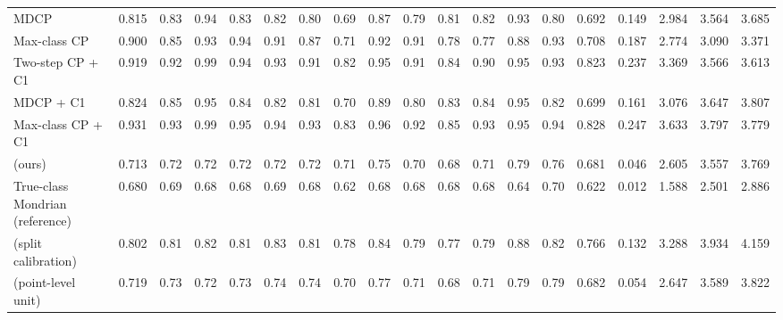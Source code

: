 \begin{table}[!htbp]
{\begin{tabular}{lcccccccccccccccccc}
MDCP & 0.815 & 0.83 & 0.94 & 0.83 & 0.82 & 0.80 & 0.69 & 0.87 & 0.79 & 0.81 & 0.82 & 0.93 & 0.80 & 0.692 & 0.149 & 2.984 & 3.564 & 3.685 \\
Max-class CP & 0.900 & 0.85 & 0.93 & 0.94 & 0.91 & 0.87 & 0.71 & 0.92 & 0.91 & 0.78 & 0.77 & 0.88 & 0.93 & 0.708 & 0.187 & 2.774 & 3.090 & 3.371 \\
Two-step CP + C1 & 0.919 & 0.92 & 0.99 & 0.94 & 0.93 & 0.91 & 0.82 & 0.95 & 0.91 & 0.84 & 0.90 & 0.95 & 0.93 & 0.823 & 0.237 & 3.369 & 3.566 & 3.613 \\
MDCP + C1 & 0.824 & 0.85 & 0.95 & 0.84 & 0.82 & 0.81 & 0.70 & 0.89 & 0.80 & 0.83 & 0.84 & 0.95 & 0.82 & 0.699 & 0.161 & 3.076 & 3.647 & 3.807 \\
Max-class CP + C1 & 0.931 & 0.93 & 0.99 & 0.95 & 0.94 & 0.93 & 0.83 & 0.96 & 0.92 & 0.85 & 0.93 & 0.95 & 0.94 & 0.828 & 0.247 & 3.633 & 3.797 & 3.779 \\
\gamut{} (ours) & 0.713 & 0.72 & 0.72 & 0.72 & 0.72 & 0.72 & 0.71 & 0.75 & 0.70 & 0.68 & 0.71 & 0.79 & 0.76 & 0.681 & 0.046 & 2.605 & 3.557 & 3.769 \\
True-class Mondrian (reference) & 0.680 & 0.69 & 0.68 & 0.68 & 0.69 & 0.68 & 0.62 & 0.68 & 0.68 & 0.68 & 0.68 & 0.64 & 0.70 & 0.622 & 0.012 & 1.588 & 2.501 & 2.886 \\
\gamut{} (split calibration) & 0.802 & 0.81 & 0.82 & 0.81 & 0.83 & 0.81 & 0.78 & 0.84 & 0.79 & 0.77 & 0.79 & 0.88 & 0.82 & 0.766 & 0.132 & 3.288 & 3.934 & 4.159 \\
\gamut{} (point-level unit) & 0.719 & 0.73 & 0.72 & 0.73 & 0.74 & 0.74 & 0.70 & 0.77 & 0.71 & 0.68 & 0.71 & 0.79 & 0.79 & 0.682 & 0.054 & 2.647 & 3.589 & 3.822 \\
\bottomrule
\end{tabular}}
\end{table}

